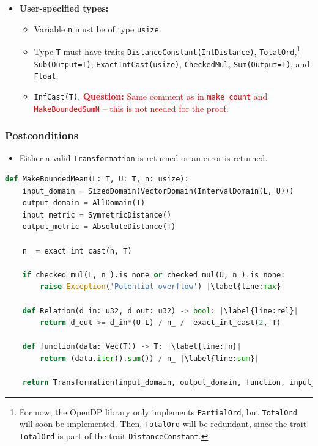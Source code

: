 \documentclass[11pt,a4paper]{article}
\theoremstyle{definition}
\newcommand{\questionc}[1]{\textcolor{red}{\textbf{Question:} #1}}
\begin{document}
\begin{itemize}
    \item \textbf{User-specified types:}
    \begin{itemize}
        \item Variable \texttt{n} must be of type \texttt{usize}.
        \item Type \texttt{T} must have traits \texttt{DistanceConstant(IntDistance)}, \texttt{TotalOrd},\footnote{For now, the OpenDP library only implements \texttt{PartialOrd}, but \texttt{TotalOrd} will soon be implemented. Then, \texttt{TotalOrd} will be redundant, since the trait \texttt{TotalOrd} is part of the trait \texttt{DistanceConstant}.} \texttt{Sub(Output=T)}, \texttt{ExactIntCast(usize)}, \texttt{CheckedMul}, \texttt{Sum(Output=T)}, and \texttt{Float}. 
        \item \texttt{InfCast(T)}. \questionc{Same comment as in \texttt{make\_count} and \texttt{MakeBoundedSumN} -- this is not needed for the proof.}
    \end{itemize}
\end{itemize}

\subsubsection*{Postconditions}
\begin{itemize}
    \item Either a valid \texttt{Transformation} is returned or an error is returned.
\end{itemize}

\begin{lstlisting}[language=Python, escapechar=|]
def MakeBoundedMean(L: T, U: T, n: usize):
    input_domain = SizedDomain(VectorDomain(IntervalDomain(L, U)))
    output_domain = AllDomain(T)
    input_metric = SymmetricDistance()
    output_metric = AbsoluteDistance(T)
    
    n_ = exact_int_cast(n, T)
    
    if checked_mul(L, n_).is_none or checked_mul(U, n_).is_none: 
        raise Exception('Potential overflow') |\label{line:max}|
    
    def Relation(d_in: u32, d_out: u32) -> bool: |\label{line:rel}|
        return d_out >= d_in*(U-L) / n_ /  exact_int_cast(2, T)
    
    def function(data: Vec(T)) -> T: |\label{line:fn}|
        return (data.iter().sum()) / n_ |\label{line:sum}|
    
    return Transformation(input_domain, output_domain, function, input_metric, output_metric, stability_relation = Relation)
\end{lstlisting}
\end{document}
